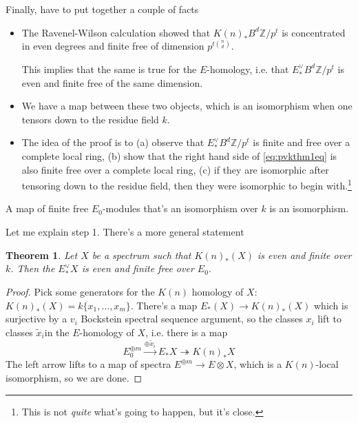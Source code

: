 \documentclass{article}
\newcommand{\Z}{{\mathbb{Z}}}
\theoremstyle{definition} \newtheorem*{defn}{Definition}
\theoremstyle{plain} \newtheorem*{prop}{Proposition}
\theoremstyle{plain} \newtheorem*{lemma}{Lemma}
\theoremstyle{plain} \newtheorem*{cor}{Corollary}
\theoremstyle{remark} \newtheorem*{ex}{Example}
\theoremstyle{remark} \newtheorem*{exs}{Examples}
\theoremstyle{remark} \newtheorem*{nonex}{Non-example}
\theoremstyle{remark} \newtheorem*{rmk}{Remark}
\theoremstyle{remark} \newtheorem*{exc}{Exercise}
\theoremstyle{remark} \newtheorem*{idea}{Idea}
\theoremstyle{remark} \newtheorem*{obs}{Observation}
\theoremstyle{plain} \newtheorem*{theorem}{Theorem}
\theoremstyle{plain} \newtheorem*{conj}{Conjecture}
\theoremstyle{remark} \newtheorem*{q}{Question}
\theoremstyle{definition} \newtheorem*{fact}{Fact}
\theoremstyle{definition} \newtheorem*{facts}{Facts}
\theoremstyle{remark} \newtheorem*{ntn}{Notation}
\theoremstyle{remark} \newtheorem*{goal}{Goal}
\theoremstyle{remark} \newtheorem*{sketch}{Sketch}
\theoremstyle{definition} \newtheorem{claim}{Claim}
\newenvironment{proofsketch}{%
  \renewcommand{\proofname}{Proof Sketch}\proof}{\endproof}
\begin{document}
\begin{proofsketch}[Case d = 1]
	Finally, have to put together a couple of facts
	\begin{itemize}
		\item The Ravenel-Wilson calculation showed that $ K(n)_* B^d \Z/p^t $ is concentrated in even degrees and finite free of dimension $p^{t{n \choose d}}$. 

		This implies that the same is true for the $ E $-homology, i.e. that $ E^\vee_*B^d \Z/p^t $ is even and finite free of the same dimension. 

		\item We have a map between these two objects, which is an isomorphism when one tensors down to the residue field $ k $. 

		\item The idea of the proof is to (a) observe that $ E^\vee_*B^d \Z/p^t $ is finite and free over a complete local ring, (b) show that the right hand side of \ref{eq:pvkthm1eq} is also finite free over a complete local ring, (c) if they are isomorphic after tensoring down to the residue field, then they were isomorphic to begin with.\footnote{This is not \emph{quite} what's going to happen, but it's close.}
	\end{itemize}
\end{proofsketch}
A map of finite free $ E_0 $-modules that's an isomorphism over $  k $ is an isomorphism. 

Let me explain step 1. 
There's a more general statement
\begin{theorem}
	Let $ X $ be a spectrum such that $ K(n)_*(X) $ is even and finite over $ k $. 
	Then the $ E^\vee_*X $ is even and finite free over $ E_0 $. 
\end{theorem}
\begin{proof} 
	Pick some generators for the $ K(n) $ homology of $ X $: $ K(n)_*(X) = k\{x_1, \ldots, x_m \} $. 
	There's a map $ E_*(X) \to K(n)_*(X) $ which is surjective by a $ v_i $ Bockstein spectral sequence argument, so the classes $ x_i $ lift to classes $ \tilde{x}_i $in the $ E $-homology of $ X $, i.e. there is a map
	\begin{equation*}
		E_0^{\oplus m} \xrightarrow{\oplus \tilde{x}_i} E_*X \twoheadrightarrow K(n)_* X
	\end{equation*}
	The left arrow lifts to a map of spectra $ E^{\oplus m} \to E \otimes X $, which is a $ K(n) $-local isomorphism, so we are done.
\end{proof}
\end{document}
